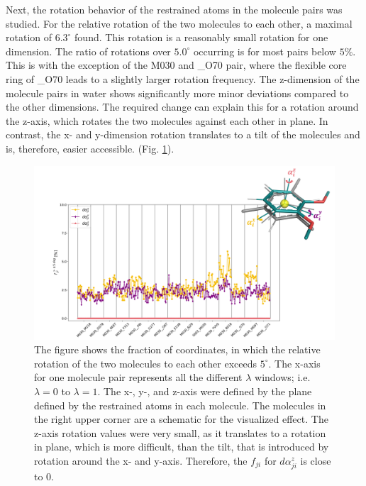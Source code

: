 Next, the rotation behavior of the restrained atoms in the molecule pairs was studied. For the relative rotation of the two molecules to each other, a maximal rotation of $6.3^\circ$ found. This rotation is a reasonably small rotation for one dimension. The ratio of rotations over $5.0^\circ$ occurring is for most pairs below $5\%$. This is with the exception of the M030 and \_O70 pair, where the flexible core ring of \_O70 leads to a slightly larger rotation frequency. The z-dimension of the molecule pairs in water shows significantly more minor deviations compared to the other dimensions. The required change can explain this for a rotation around the z-axis, which rotates the two molecules against each other in plane. In contrast, the x- and y-dimension rotation translates to a tilt of the molecules and is, therefore, easier accessible.  (Fig. \ref{fig: pairMolRotation_TIStarMap}).
 
 
\begin{figure}[h]
    \centering
    \includegraphics[width=\textwidth]{fig/results/pairwise/sampling/TI_pairwise_molecule_rotation.png}
    \caption{The figure shows the fraction of coordinates, in which the relative rotation of the two molecules to each other exceeds $5^{\circ}$.  The x-axis for one molecule pair represents all the different $\lambda$ windows; i.e. $\lambda = 0$ to $\lambda = 1$. The x-, y-, and z-axis were defined by the plane defined by the restrained atoms in each molecule. The molecules in the right upper corner are a schematic for the visualized effect. The z-axis rotation values were very small, as it translates to a rotation in plane, which is more difficult, than the tilt, that is introduced by rotation around the x- and y-axis. Therefore, the $f_{ji}$ for $d\alpha_{ji}^z$ is close to 0. }
    \label{fig: pairMolRotation_TIStarMap}
\end{figure}

